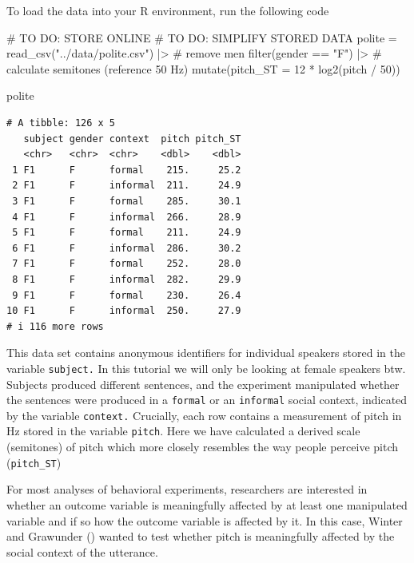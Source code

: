 \documentclass[
  doc,
  longtable,
  nolmodern,
  notxfonts,
  notimes,
  colorlinks=true,linkcolor=blue,citecolor=blue,urlcolor=blue]{apa7}
\newenvironment{Shaded}{\begin{snugshade}}{\end{snugshade}}
\newcommand{\AttributeTok}[1]{\textcolor[rgb]{0.40,0.45,0.13}{#1}}
\newcommand{\CommentTok}[1]{\textcolor[rgb]{0.37,0.37,0.37}{#1}}
\newcommand{\DecValTok}[1]{\textcolor[rgb]{0.68,0.00,0.00}{#1}}
\newcommand{\FunctionTok}[1]{\textcolor[rgb]{0.28,0.35,0.67}{#1}}
\newcommand{\NormalTok}[1]{\textcolor[rgb]{0.00,0.23,0.31}{#1}}
\newcommand{\OtherTok}[1]{\textcolor[rgb]{0.00,0.23,0.31}{#1}}
\newcommand{\SpecialCharTok}[1]{\textcolor[rgb]{0.37,0.37,0.37}{#1}}
\newcommand{\StringTok}[1]{\textcolor[rgb]{0.13,0.47,0.30}{#1}}
\begin{document}
To load the data into your R environment, run the following code

\begin{Shaded}
\begin{Highlighting}[]
\CommentTok{\# TO DO: STORE ONLINE}
\CommentTok{\# TO DO: SIMPLIFY STORED DATA}
\NormalTok{polite }\OtherTok{=} \FunctionTok{read\_csv}\NormalTok{(}\StringTok{"../data/polite.csv"}\NormalTok{) }\SpecialCharTok{|\textgreater{}} 
  \CommentTok{\# remove men}
  \FunctionTok{filter}\NormalTok{(gender }\SpecialCharTok{==} \StringTok{"F"}\NormalTok{) }\SpecialCharTok{|\textgreater{}} 
  \CommentTok{\# calculate semitones (reference 50 Hz)}
  \FunctionTok{mutate}\NormalTok{(}\AttributeTok{pitch\_ST =} \DecValTok{12} \SpecialCharTok{*} \FunctionTok{log2}\NormalTok{(pitch }\SpecialCharTok{/} \DecValTok{50}\NormalTok{))}

\NormalTok{polite}
\end{Highlighting}
\end{Shaded}

\begin{verbatim}
# A tibble: 126 x 5
   subject gender context  pitch pitch_ST
   <chr>   <chr>  <chr>    <dbl>    <dbl>
 1 F1      F      formal    215.     25.2
 2 F1      F      informal  211.     24.9
 3 F1      F      formal    285.     30.1
 4 F1      F      informal  266.     28.9
 5 F1      F      formal    211.     24.9
 6 F1      F      informal  286.     30.2
 7 F1      F      formal    252.     28.0
 8 F1      F      informal  282.     29.9
 9 F1      F      formal    230.     26.4
10 F1      F      informal  250.     27.9
# i 116 more rows
\end{verbatim}

This data set contains anonymous identifiers for individual speakers
stored in the variable \texttt{subject.} In this tutorial we will only
be looking at female speakers btw. Subjects produced diﬀerent sentences,
and the experiment manipulated whether the sentences were produced in a
\texttt{formal} or an \texttt{informal} social context, indicated by the
variable \texttt{context.} Crucially, each row contains a measurement of
pitch in Hz stored in the variable \texttt{pitch}. Here we have
calculated a derived scale (semitones) of pitch which more closely
resembles the way people perceive pitch (\texttt{pitch\_ST})

For most analyses of behavioral experiments, researchers are interested
in whether an outcome variable is meaningfully affected by at least one
manipulated variable and if so how the outcome variable is affected by
it. In this case, Winter and Grawunder
()
wanted to test whether pitch is meaningfully affected by the social
context of the utterance.
\end{document}

